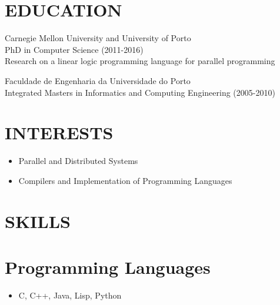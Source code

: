 \documentclass[margin]{res}
\begin{document}

\address{Albisstrasse, 8 \\ 8134 Adliswil, ZH, Switzerland}

\begin{resume}

\section{EDUCATION}

                Carnegie Mellon University and University of Porto \\
                PhD in Computer Science (2011-2016) \\
                Research on a linear logic programming language for parallel
                programming

Faculdade de Engenharia da Universidade do Porto \\
                Integrated Masters in Informatics and Computing Engineering (2005-2010) \\

\section{INTERESTS}

                 \begin{itemize}
                    \item Parallel and Distributed Systems
                    \item Compilers and Implementation of Programming Languages
                 \end{itemize}
                  
\section{SKILLS} 
\normalsize{\section{Programming Languages}}
                 \begin{itemize}
                 \item C, C++, Java, Lisp, Python
                 \end{itemize}
                 

\end{resume}
\end{document}
